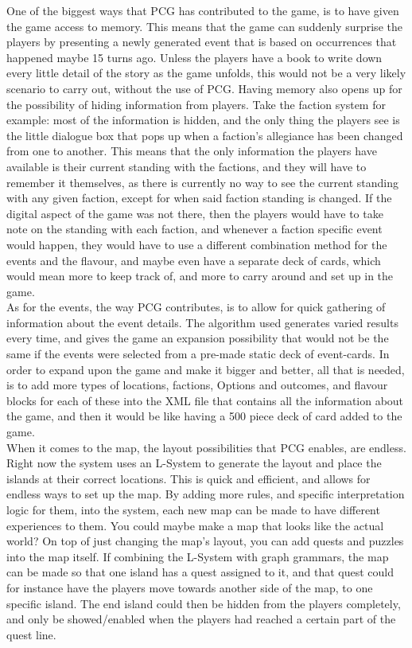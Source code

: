 One of the biggest ways that PCG has contributed to the game, is to have given the game access to memory. This means that the game can suddenly surprise the players by presenting a newly generated event that is based on occurrences that happened maybe 15 turns ago. Unless the players have a book to write down every little detail of the story as the game unfolds, this would not be a very likely scenario to carry out, without the use of PCG. 
Having memory also opens up for the possibility of hiding information from players. Take the faction system for example: most of the information is hidden, and the only thing the players see is the little dialogue box that pops up when a faction's allegiance has been changed from one to another. This means that the only information the players have available is their current standing with the factions, and they will have to remember it themselves, as there is currently no way to see the current standing with any given faction, except for when said faction standing is changed. If the digital aspect of the game was not there, then the players would have to take note on the standing with each faction, and whenever a faction specific event would happen, they would have to use a different combination method for the events and the flavour, and maybe even have a separate deck of cards, which would mean more to keep track of, and more to carry around and set up in the game.\\
As for the events, the way PCG contributes, is to allow for quick gathering of information about the event details. The algorithm used generates varied results every time, and gives the game an expansion possibility that would not be the same if the events were selected from a pre-made static deck of event-cards. In order to expand upon the game and make it bigger and better, all that is needed, is to add more types of locations, factions, Options and outcomes, and flavour blocks for each of these into the XML file that contains all the information about the game, and then it would be like having a 500 piece deck of card added to the game.\\
When it comes to the map, the layout possibilities that PCG enables, are endless. Right now the system uses an L-System to generate the layout and place the islands at their correct locations. This is quick and efficient, and allows for endless ways to set up the map. By adding more rules, and specific interpretation logic for them, into the system, each new map can be made to have different experiences to them. You could maybe make a map that looks like the actual world? 
On top of just changing the map's layout, you can add quests and puzzles into the map itself. If combining the L-System with graph grammars, the map can be made so that one island has a quest assigned to it, and that quest could for instance have the players move towards another side of the map, to one specific island. The end island could then be hidden from the players completely, and only be showed/enabled when the players had reached a certain part of the quest line.

